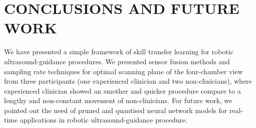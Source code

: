 \documentclass[a4paper, 10pt, conference]{ieeeconf}      %
\begin{document}
 
\section{CONCLUSIONS AND FUTURE WORK}
We have presented a simple framework of skill transfer learning for robotic ultrasound-guidance procedures.
We presented sensor fusion methods and sampling rate techniques for optimal scanning plane of the four-chamber view from three participants (one experienced clinician and two non-clinicians), where experienced clinician showed an smother and quicker procedure compare to a lengthy and non-constant movement of non-clinicians.
For future work, we pointed out the need of pruned and quantised neural network models for real-time applications in robotic ultrasound-guidance procedure. 


\addtolength{\textheight}{-12cm}   %
\end{document}
